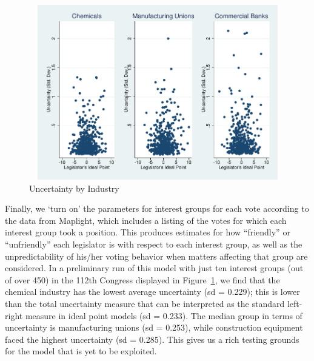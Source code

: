 \documentclass[12pt]{article}
\begin{document}
\begin{figure}
\begin{center}
\includegraphics[height=3in, width=6.5in]{NSF_combined_graph.pdf}
\end{center}
\caption{Uncertainty by Industry\label{fig:combined}}
\end{figure}

Finally, we `turn on' the parameters for interest groups for each vote according to the data from Maplight, which includes a listing of the votes for which each interest group took a position. This produces estimates for how ``friendly'' or ``unfriendly'' each legislator is with respect to each interest group, as well as the unpredictability of his/her voting behavior when matters affecting that group are considered. In a preliminary run of this model with just ten interest groups (out of over 450) in the 112th Congress displayed in Figure~\ref{fig:combined}, we find that the chemical industry has the lowest average uncertainty (sd = 0.229); this is lower than the total uncertainty measure that can be interpreted as the standard left-right measure in ideal point models (sd = 0.233). The median group in terms of uncertainty is manufacturing unions (sd = 0.253), while construction equipment faced the highest uncertainty (sd = 0.285). This gives us a rich testing grounds for the model that is yet to be exploited.






\end{document}
